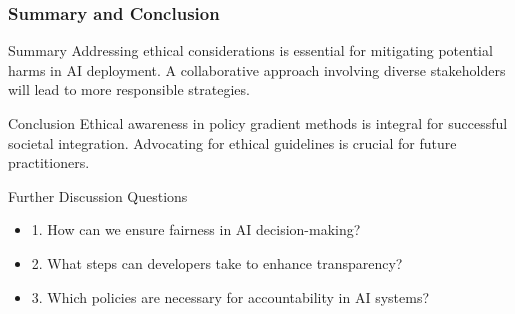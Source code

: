 \documentclass[aspectratio=169]{beamer}
\begin{document}
\begin{frame}[fragile]
    \frametitle{Summary and Conclusion}
    \begin{block}{Summary}
        Addressing ethical considerations is essential for mitigating potential harms in AI deployment. A collaborative approach involving diverse stakeholders will lead to more responsible strategies.
    \end{block}

    \begin{block}{Conclusion}
        Ethical awareness in policy gradient methods is integral for successful societal integration. Advocating for ethical guidelines is crucial for future practitioners.
    \end{block}

    \begin{block}{Further Discussion Questions}
        \begin{itemize}
            \item 1. How can we ensure fairness in AI decision-making?
            \item 2. What steps can developers take to enhance transparency?
            \item 3. Which policies are necessary for accountability in AI systems?
        \end{itemize}
    \end{block}
\end{frame}
\end{document}
